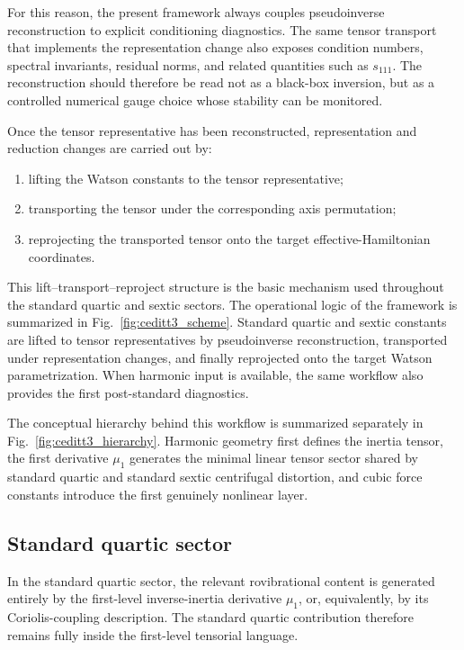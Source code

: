 For this reason, the present framework always couples pseudoinverse
reconstruction to explicit conditioning diagnostics. The same tensor
transport that implements the representation change also exposes
condition numbers, spectral invariants, residual norms, and related
quantities such as $s_{111}$. The reconstruction should therefore be
read not as a black-box inversion, but as a controlled numerical gauge
choice whose stability can be monitored.

Once the tensor representative has been reconstructed, representation
and reduction changes are carried out by:
\begin{enumerate}
\item lifting the Watson constants to the tensor representative;
\item transporting the tensor under the corresponding axis permutation;
\item reprojecting the transported tensor onto the target effective-Hamiltonian
coordinates.
\end{enumerate}

This lift--transport--reproject structure is the basic mechanism used
throughout the standard quartic and sextic sectors. The operational
logic of the framework is summarized in Fig.~\ref{fig:ceditt3_scheme}.
Standard quartic and sextic constants are lifted to tensor
representatives by pseudoinverse reconstruction, transported under
representation changes, and finally reprojected onto the target
Watson parametrization. When harmonic input is available, the same
workflow also provides the first post-standard diagnostics.



The conceptual hierarchy behind this workflow is summarized separately
in Fig.~\ref{fig:ceditt3_hierarchy}. Harmonic geometry first defines
the inertia tensor, the first derivative $\mu_1$ generates the minimal
linear tensor sector shared by standard quartic and standard sextic
centrifugal distortion, and cubic force constants introduce the first
genuinely nonlinear layer.



\subsection{Standard quartic sector}

In the standard quartic sector, the relevant rovibrational content is
generated entirely by the first-level inverse-inertia derivative
$\mu_1$, or, equivalently, by its Coriolis-coupling description. The
standard quartic contribution therefore remains fully inside the
first-level tensorial language.

